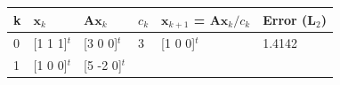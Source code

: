 \documentclass[openany]{book}
\begin{document}
\begin{longtable}[]{@{}llllll@{}}
\toprule
\begin{minipage}[b]{0.03\columnwidth}\raggedright
k\strut
\end{minipage} & \begin{minipage}[b]{0.20\columnwidth}\raggedright
\(\mathbf{x}_k\)\strut
\end{minipage} & \begin{minipage}[b]{0.20\columnwidth}\raggedright
\(\mathbf{Ax}_k\)\strut
\end{minipage} & \begin{minipage}[b]{0.05\columnwidth}\raggedright
\(c_k\)\strut
\end{minipage} & \begin{minipage}[b]{0.27\columnwidth}\raggedright
\(\mathbf{x}_{k+1}\) = \(\mathbf{Ax}_k / c_{k}\)\strut
\end{minipage} & \begin{minipage}[b]{0.09\columnwidth}\raggedright
Error (L\(_2\))\strut
\end{minipage}\tabularnewline
\midrule
\endhead
\begin{minipage}[t]{0.03\columnwidth}\raggedright
0\strut
\end{minipage} & \begin{minipage}[t]{0.20\columnwidth}\raggedright
{[}1 1 1{]}\(^t\)\strut
\end{minipage} & \begin{minipage}[t]{0.20\columnwidth}\raggedright
{[}3 0 0{]}\(^t\)\strut
\end{minipage} & \begin{minipage}[t]{0.05\columnwidth}\raggedright
3\strut
\end{minipage} & \begin{minipage}[t]{0.27\columnwidth}\raggedright
{[}1 0 0{]}\(^t\)\strut
\end{minipage} & \begin{minipage}[t]{0.09\columnwidth}\raggedright
1.4142\strut
\end{minipage}\tabularnewline
\begin{minipage}[t]{0.03\columnwidth}\raggedright
1\strut
\end{minipage} & \begin{minipage}[t]{0.20\columnwidth}\raggedright
{[}1 0 0{]}\(^t\)\strut
\end{minipage} & \begin{minipage}[t]{0.20\columnwidth}\raggedright
{[}5 -2 0{]}\(^t\)\strut
\end{minipage} & \begin{minipage}[t]{0.05\columnwidth}\raggedright

\end{minipage}
\end{longtable}
\end{document}

